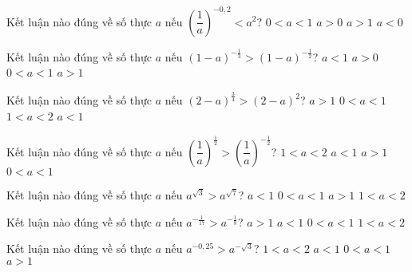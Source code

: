 \begin{ex}%
	Kết luận nào đúng về số thực $a$ nếu $\left(\dfrac{1}{a}\right)^{-0,2}<a^2$?
	\choice
	{$0<a<1$}
	{$a>0$}
	{\True $a>1$}
	{$a<0$}
\end{ex}
\begin{ex}%
	Kết luận nào đúng về số thực $a$ nếu $(1-a)^{-\tfrac{1}{3}}>(1-a)^{-\tfrac{1}{2}}$?
	\choice
	{$a<1$}
	{$a>0$}
	{$0<a<1$}
	{\True $a>1$}
\end{ex}
\begin{ex}%
	Kết luận nào đúng về số thực $a$ nếu $(2-a)^{\tfrac{3}{4}}>(2-a)^2$?
	\choice
	{$a>1$}
	{$0<a<1$}
	{\True $1<a<2$}
	{$a<1$}
\end{ex}
\begin{ex}%
	Kết luận nào đúng về số thực $a$ nếu $\left(\dfrac{1}{a}\right)^{\tfrac{1}{2}}>\left(\dfrac{1}{a}\right)^{-\tfrac{1}{2}}$?
	\choice
	{$1<a<2$}
	{$a<1$}
	{$a>1$}
	{\True $0<a<1$}
\end{ex}
\begin{ex}%
	Kết luận nào đúng về số thực $a$ nếu $a^{\sqrt{3}}>a^{\sqrt{7}}$?
	\choice
	{$a<1$}
	{\True $0<a<1$}
	{$a>1$}
	{$1<a<2$}
\end{ex}
\begin{ex}%
	Kết luận nào đúng về số thực $a$ nếu $a^{-\tfrac{1}{17}}>a^{-\tfrac{1}{8}}$?
	\choice
	{\True $a>1$}
	{$a<1$}
	{$0<a<1$}
	{$1<a<2$}
\end{ex}
\begin{ex}%
	Kết luận nào đúng về số thực $a$ nếu $a^{-0,25}>a^{-\sqrt{3}}$?
	\choice
	{$1<a<2$}
	{$a<1$}
	{$0<a<1$}
	{\True $a>1$}
\end{ex}
